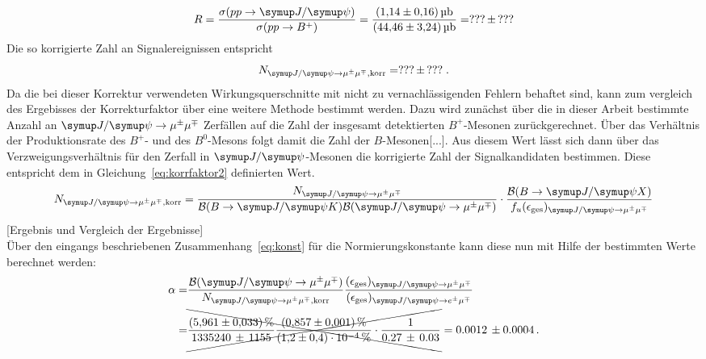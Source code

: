 %
\begin{equation}
  R=\frac{\sigma(pp\rightarrow\jpsi)}{\sigma(pp\rightarrow B^+)}=\frac{\SI{1.14(16)}{\micro\barn}}{\SI{44.46(324)}{\micro\barn}}=???\,\pm\,???
  \label{eq:korrfaktor}
\end{equation}
%
Die so korrigierte Zahl an Signalereignissen entspricht
%
\begin{equation}
  N_{\kontroll,\text{korr}}=???\,\pm\,???\; .
\end{equation}
%
Da die bei dieser Korrektur verwendeten Wirkungsquerschnitte mit nicht zu vernachlässigenden Fehlern behaftet sind, kann
zum vergleich des Ergebisses der Korrekturfaktor über eine weitere Methode bestimmt werden. Dazu wird zunächst über die in
dieser Arbeit bestimmte Anzahl an $\kontroll$ Zerfällen auf die Zahl der insgesamt detektierten $B^{+}$-Mesonen zurückgerechnet. Über das Verhältnis der Produktionsrate des $B^{+}$- und des $B^{0}$-Mesons folgt damit die Zahl der
$B$-Mesonen[...]. Aus diesem Wert lässt sich dann über das Verzweigungsverhältnis für den Zerfall in $\jpsi$-Mesonen die korrigierte Zahl der Signalkandidaten bestimmen. Diese entspricht dem in Gleichung~\eqref{eq:korrfaktor2} definierten Wert.
%
\begin{equation}
  N_{\kontroll,\text{korr}}=\frac{N_{\kontroll}}{\mathcal{B}(B\rightarrow\jpsi K)\mathcal{B}(\kontroll)}\cdot\frac{\mathcal{B}(B\rightarrow\jpsi X)}{f_u(\epsilon_{\text{ges}})_{\kontroll}}
  \label{eq:korrfaktor2}
\end{equation}
%
[Ergebnis und Vergleich der Ergebnisse]\\
Über den eingangs beschriebenen Zusammenhang~\eqref{eq:konst} für die Normierungskonstante kann diese nun mit Hilfe der bestimmten Werte berechnet werden:
%
\begin{align*}
  \alpha=&\frac{\mathcal{B}(\kontroll)}{N_{\kontroll,\text{korr}}}\frac{(\epsilon_{\text{ges}})_{\kontroll}}{(\epsilon_{\text{ges}})_{\signal}} \\
  =&\xcancel{\frac{\SI{5,961(33)}{\percent}}{1335240\,\pm\,1155}\frac{\SI{0.857(1)}{\percent}}{\SI{1.2(4)e-4}{\percent}}\cdot\frac{1}{0.27\,\pm\,0.03}}=0.0012\,\pm0.0004 \, .
\end{align*}

